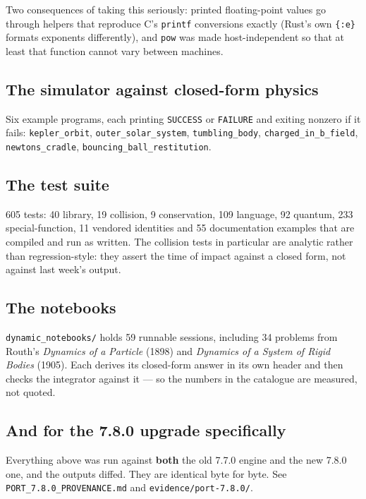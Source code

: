 \documentclass[11pt]{article}
\newcommand{\code}[1]{\texttt{#1}}
\begin{document}
Two consequences of taking this seriously: printed floating-point values
go through helpers that reproduce C's \code{printf} conversions exactly
(Rust's own \code{\{:e\}} formats exponents differently), and
\code{pow} was made host-independent so that at least that function
cannot vary between machines.

\subsection{The simulator against closed-form physics}

Six example programs, each printing \code{SUCCESS} or \code{FAILURE} and
exiting nonzero if it fails: \code{kepler\_orbit},
\code{outer\_solar\_system}, \code{tumbling\_body},
\code{charged\_in\_b\_field}, \code{newtons\_cradle},
\code{bouncing\_ball\_restitution}.

\subsection{The test suite}

605 tests: 40 library, 19 collision, 9 conservation, 109 language, 92
quantum, 233 special-function, 11 vendored identities and 55
documentation examples that are compiled and run as written. The
collision tests in particular are analytic rather than
regression-style: they assert the time of impact against a closed form,
not against last week's output.

\subsection{The notebooks}

\code{dynamic\_notebooks/} holds 59 runnable sessions, including 34
problems from Routh's \emph{Dynamics of a Particle} (1898) and
\emph{Dynamics of a System of Rigid Bodies} (1905). Each derives its
closed-form answer in its own header and then checks the integrator
against it --- so the numbers in the catalogue are measured, not quoted.

\subsection{And for the 7.8.0 upgrade specifically}

Everything above was run against \textbf{both} the old 7.7.0 engine and
the new 7.8.0 one, and the outputs diffed. They are identical byte for
byte. See \code{PORT\_7.8.0\_PROVENANCE.md} and
\code{evidence/port-7.8.0/}.
\end{document}
